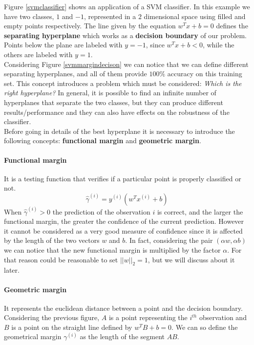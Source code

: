 Figure \ref{svmclassifier} shows an application of a SVM classifier. In this example we have two classes, $1$ and $-1$, represented in a $2$ dimensional space using filled and empty points respectively. The line given by the equation $w^Tx + b = 0$ defines the \textbf{separating hyperplane} which works as a \textbf{decision boundary} of our problem. Points below the plane are labeled with $y = -1$, since $w^Tx+b < 0$, while the others are labeled with $y = 1$.\\

Considering Figure \ref{svmmargindecison} we can notice that we can define different separating hyperplanes, and all of them provide $100\%$ accuracy on this training set. This concept introduces a problem which must be considered: \textit{Which is the right hyperplane?} In general, it is possible to find an infinite number of hyperplanes that separate the two classes, but they can produce different results/performance and they can also have effects on the robustness of the classifier.\\
Before going in details of the best hyperplane it is necessary to introduce the following concepts: \textbf{functional margin} and \textbf{geometric margin}.

\paragraph{Functional margin} It is a testing function that verifies if a particular point is properly classified or not.
$$\hat{\gamma}^{(i)} = y^{(i)}(w^Tx^{(i)} + b)$$
When $\hat{\gamma}^{(i)} > 0$ the prediction of the observation $i$ is correct, and the larger the functional margin, the greater the confidence of the current prediction. However it cannot be considered as a very good measure of confidence since it is affected by the length of the two vectors $w$ and $b$. In fact, considering the pair $(\alpha w, \alpha b)$ we can notice that the new functional margin is multiplied by the factor $\alpha$. For that reason could be reasonable to set $||w||_2 = 1$, but we will discuss about it later.


\paragraph{Geometric margin} It represents the euclidean distance between a point and the decision boundary.
Considering the previous figure, $A$ is a point representing the $i^{th}$ observation and $B$ is a point on the straight line defined by $w^TB+b = 0$. We can so define the geometrical margin $\gamma^{(i)}$ as the length of the segment $AB$. \\

